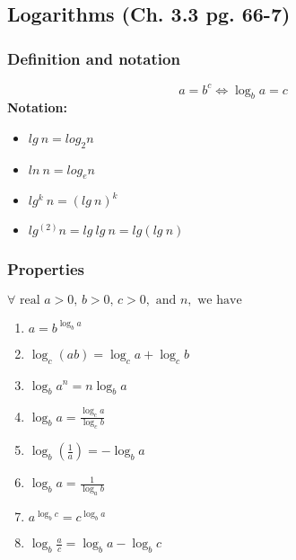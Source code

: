 \subsection{Logarithms (Ch. 3.3 pg. 66-7)}
    \subsubsection{Definition and notation}
        \begin{definition}
            \begin{equation}
                a = b^c \iff \log_b a = c
            \end{equation}
            \vspace{1em}
            \textbf{Notation:}
            \begin{itemize}
                \item $lg \: n = log_2 n$
                \item $ln \: n = log_e n$
                \item $lg^k \: n = (lg \: n)^k$
                \item $lg^{(2)} n = lg \: lg \: n = lg(lg \: n)$
            \end{itemize}
        \end{definition}

    \subsubsection{Properties}
        \begin{definition}
            $\forall \text{ real } a>0 \text{, } b>0 \text{, } c>0, \text{ and } n, \text{ we have}$
            \begin{enumerate}
                \item \( a = b^{\log_b a} \)
                \item \( \log_c(ab) = \log_c a + \log_c b \)
                \item \( \log_b a^n = n \log_b a \)
                \item \( \log_b a = \frac{\log_c a}{\log_c b} \)
                \item \( \log_b \left(\frac{1}{a}\right) = -\log_b a \)
                \item \( \log_b a = \frac{1}{\log_a b} \)
                \item \( a^{\log_b c} = c^{\log_b a} \)
                \item \( \log_b \frac{a}{c} = \log_b a - \log_b c\)
            \end{enumerate}
        \end{definition}


